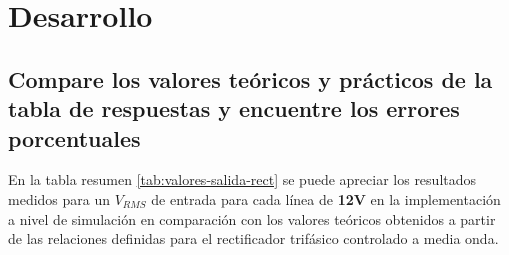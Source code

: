 \chapter{Desarrollo}

\section{ Compare los valores teóricos y prácticos de la tabla de respuestas y encuentre los errores porcentuales}

En la tabla resumen \ref{tab:valores-salida-rect} se puede apreciar los resultados medidos para un $V_{RMS}$ de entrada para cada línea de \textbf{12V} en la implementación a nivel de simulación en comparación con los valores teóricos obtenidos a partir de las relaciones definidas para el rectificador trifásico controlado a media onda.


